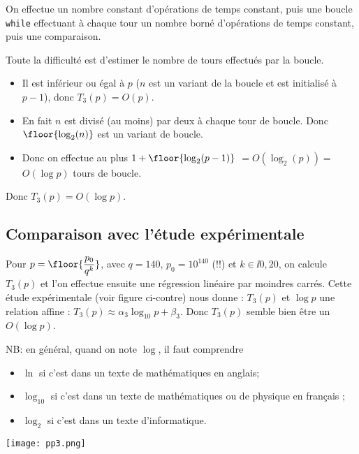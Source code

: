 On effectue un nombre constant d'opérations de temps constant, puis
une boucle \texttt{while} effectuant à chaque tour un nombre borné
d'opérations de temps constant, puis une comparaison.

Toute la difficulté est d'estimer le nombre de tours effectués par la
boucle.
\begin{itemize}
\item[\textbullet] Il est inférieur ou égal à $p$ ($n$ est un variant de la
  boucle et est initialisé à $p-1$), donc $T_{3}(p)=O(p)$.
\item[\textbullet] En fait $n$
  est divisé (au moins) par deux à chaque tour de boucle. Donc
  $\floor{\log_{2}(n)}$ est un variant de boucle.
\item[\textbullet] Donc on effectue au
  plus $1+ \floor{\log_{2}(p-1)}$ $= O(\log_{2}(p)) =$ $ O(\log p)$ tours de boucle.
\end{itemize}
Donc $T_{3}(p) = O(\log p)$.


\subsection{Comparaison avec l'étude expérimentale}

\begin{minipage}[c]{.48\linewidth}
Pour $p = \floor{\dfrac{p_0}{q^k}}$, avec $q = 140$, $p_0 = 10^{140}$ (!!) et $k\in\ii{0,20}$, on calcule $T_3(p)$ et l'on effectue ensuite une régression linéaire par moindres carrés. Cette étude expérimentale 
(voir figure ci-contre) 
nous donne :
$T_{3}(p)$ et $\log p$ une relation affine :
$  T_{3}(p) \approx \alpha_{3}\log_{10} p + \beta_{3}$. Donc $T_{3}(p)$ semble bien être un $O(\log p)$.

NB: en général, quand on note $\log$, il faut comprendre
\begin{itemize}
\item $\ln$ si c'est dans un texte de mathématiques en anglais;
\item $\log_{10}$ si c'est dans un texte de mathématiques ou de
  physique en français ;
\item $\log_{2}$ si c'est dans un texte d'informatique.
\end{itemize}

\end{minipage} \hfill
\begin{minipage}[c]{.48\linewidth}
  \begin{center}
    \texttt{[image: pp3.png]}
  \end{center}
\end{minipage}

